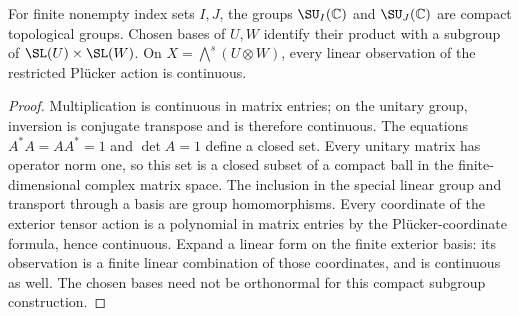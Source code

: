 \begin{lemma}
\label{lem:balanced-special-unitary-action}
\leanok
{}
For finite nonempty index sets $I,J$, the groups $\SU_I(\mathbb C)$ and
$\SU_J(\mathbb C)$ are compact topological groups. Chosen bases of
$U,W$ identify their product with a subgroup of
$\SL(U)\times\SL(W)$. On $X=\bigwedge^s(U\otimes W)$, every linear
observation of the restricted Pl\"ucker action is continuous.
\end{lemma}
\begin{proof}
Multiplication is continuous in matrix entries; on the unitary group,
inversion is conjugate transpose and is therefore continuous.
The equations $A^*A=AA^*=1$ and $\det A=1$ define a closed set.
Every unitary matrix has operator norm one, so this set is a closed
subset of a compact ball in the finite-dimensional complex matrix space.
The inclusion in the special linear group and transport through a basis
are group homomorphisms. Every coordinate of the exterior tensor action
is a polynomial in matrix entries by the Pl\"ucker-coordinate formula,
hence continuous. Expand a linear form on the finite exterior basis:
its observation is a finite linear combination of those coordinates,
and is continuous as well. The chosen bases need not be orthonormal
for this compact subgroup construction.
\end{proof}


